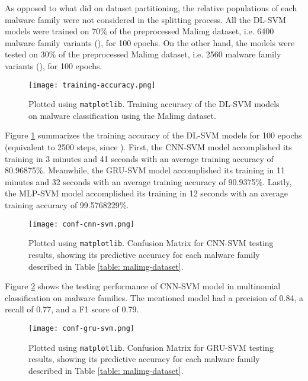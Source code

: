 \documentclass[sigconf]{acmart}
\begin{document}
\indent	As opposed to what \cite{garcia2016random} did on dataset partitioning, the relative populations of each malware family were not considered in the splitting process. All the DL-SVM models were trained on 70\% of the preprocessed Malimg dataset\cite{nataraj2011malware}, i.e. 6400 malware family variants (), for 100 epochs. On the other hand, the models were tested on 30\% of the preprocessed Malimg dataset\cite{nataraj2011malware}, i.e. 2560 malware family variants (), for 100 epochs.
\begin{figure}[!htb]
	\centering
		\texttt{[image: training-accuracy.png]}
		\caption{Plotted using \texttt{matplotlib}\cite{Hunter:2007}. Training accuracy of the DL-SVM models on malware classification using the Malimg dataset\cite{nataraj2011malware}.}
		\label{training-accuracy}
	\endminipage\hfill
\end{figure}

\indent	Figure \ref{training-accuracy} summarizes the training accuracy of the DL-SVM models for 100 epochs (equivalent to 2500 steps, since ). First, the CNN-SVM model accomplished its training in 3 minutes and 41 seconds with an average training accuracy of 80.96875\%. Meanwhile, the GRU-SVM model accomplished its training in 11 minutes and 32 seconds with an average training accuracy of 90.9375\%. Lastly, the MLP-SVM model accomplished its training in 12 seconds with an average training accuracy of 99.5768229\%.

\begin{figure}[htb!]
	\centering
		\texttt{[image: conf-cnn-svm.png]}
		\caption{Plotted using \texttt{matplotlib}\cite{Hunter:2007}. Confusion Matrix for CNN-SVM testing results, showing its predictive accuracy for each malware family described in Table \ref{table: malimg-dataset}.}
		\label{conf-cnn-svm}
	\endminipage\hfill
\end{figure}

Figure \ref{conf-cnn-svm} shows the testing performance of CNN-SVM model in multinomial classification on malware families. The mentioned model had a precision of 0.84, a recall of 0.77, and a F1 score of 0.79.

\begin{figure}[!htb]
	\centering
		\texttt{[image: conf-gru-svm.png]}
		\caption{Plotted using \texttt{matplotlib}\cite{Hunter:2007}. Confusion Matrix for GRU-SVM testing results, showing its predictive accuracy for each malware family described in Table \ref{table: malimg-dataset}.}
		\label{conf-gru-svm}
	\endminipage\hfill
\end{figure}
\end{document}
